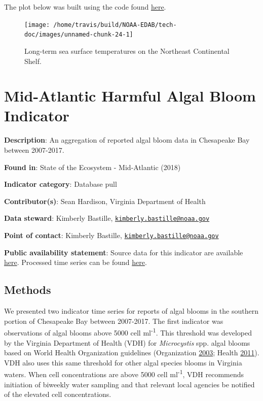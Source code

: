 \documentclass[
]{book}
\begin{document}
The plot below was built using the code found
\href{https://github.com/NOAA-EDAB/ecodata/blob/master/chunk-scripts/LTL.Rmd-long-term-sst.R}{here}.

\begin{figure}

{\centering \texttt{[image: /home/travis/build/NOAA-EDAB/tech-doc/images/unnamed-chunk-24-1]} 

}

\caption{Long-term sea surface temperatures on the Northeast Continental Shelf.}\label{fig:unnamed-chunk-24}
\end{figure}

\hypertarget{mid-atlantic-harmful-algal-bloom-indicator}{%
\chapter{Mid-Atlantic Harmful Algal Bloom Indicator}\label{mid-atlantic-harmful-algal-bloom-indicator}}

\textbf{Description}: An aggregation of reported algal bloom data in Chesapeake Bay between 2007-2017.

\textbf{Found in}: State of the Ecosystem - Mid-Atlantic (2018)

\textbf{Indicator category}: Database pull

\textbf{Contributor(s)}: Sean Hardison, Virginia Department of Health

\textbf{Data steward}: Kimberly Bastille, \href{mailto:kimberly.bastille@noaa.gov}{\nolinkurl{kimberly.bastille@noaa.gov}}

\textbf{Point of contact}: Kimberly Bastille, \href{mailto:kimberly.bastille@noaa.gov}{\nolinkurl{kimberly.bastille@noaa.gov}}

\textbf{Public availability statement}: Source data for this indicator are available \href{https://github.com/NOAA-EDAB/tech-doc/tree/master/data/CB_HAB}{here}. Processed time series can be found \href{http://comet.nefsc.noaa.gov/erddap/tabledap/CBhabs_ann_soe_v2.html}{here}.

\hypertarget{methods-22}{%
\section{Methods}\label{methods-22}}

We presented two indicator time series for reports of algal blooms in the southern portion of Chesapeake Bay between 2007-2017. The first indicator was observations of algal blooms above 5000 cell ml\textsuperscript{-1}. This threshold was developed by the Virginia Department of Health (VDH) for \emph{Microcystis} spp. algal blooms based on World Health Organization guidelines (Organization \protect\hyperlink{ref-WHO2003}{2003}; Health \protect\hyperlink{ref-VDH2011}{2011}). VDH also uses this same threshold for other algal species blooms in Virginia waters. When cell concentrations are above 5000 cell ml\textsuperscript{-1}, VDH recommends initiation of biweekly water sampling and that relevant local agencies be notified of the elevated cell concentrations.
\end{document}

